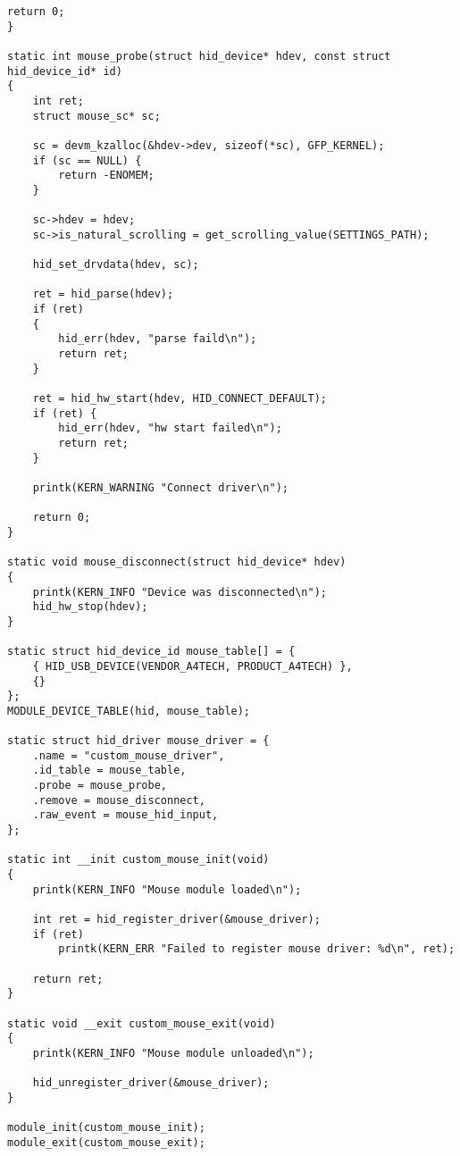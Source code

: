 \documentclass{bmstu}
\begin{document}
\begin{lstlisting}[caption={Загружаемый модуль ядра реализующий драйвер мыши}, label=lst:prill]
    return 0;
}

static int mouse_probe(struct hid_device* hdev, const struct hid_device_id* id)
{
    int ret;
    struct mouse_sc* sc;

    sc = devm_kzalloc(&hdev->dev, sizeof(*sc), GFP_KERNEL);
    if (sc == NULL) {
        return -ENOMEM;
    }

    sc->hdev = hdev;
    sc->is_natural_scrolling = get_scrolling_value(SETTINGS_PATH);

    hid_set_drvdata(hdev, sc);

    ret = hid_parse(hdev);
    if (ret)
    {
        hid_err(hdev, "parse faild\n");
        return ret;
    }

    ret = hid_hw_start(hdev, HID_CONNECT_DEFAULT);
    if (ret) {
        hid_err(hdev, "hw start failed\n");
        return ret;
    }

    printk(KERN_WARNING "Connect driver\n");

    return 0;
}

static void mouse_disconnect(struct hid_device* hdev)
{
    printk(KERN_INFO "Device was disconnected\n");
    hid_hw_stop(hdev);
}

static struct hid_device_id mouse_table[] = {
    { HID_USB_DEVICE(VENDOR_A4TECH, PRODUCT_A4TECH) },
    {}
};
MODULE_DEVICE_TABLE(hid, mouse_table);

static struct hid_driver mouse_driver = {
    .name = "custom_mouse_driver",
    .id_table = mouse_table,
    .probe = mouse_probe,
    .remove = mouse_disconnect,
    .raw_event = mouse_hid_input,
};

static int __init custom_mouse_init(void)
{
    printk(KERN_INFO "Mouse module loaded\n");

    int ret = hid_register_driver(&mouse_driver);
    if (ret)
        printk(KERN_ERR "Failed to register mouse driver: %d\n", ret);

    return ret;
}

static void __exit custom_mouse_exit(void)
{
    printk(KERN_INFO "Mouse module unloaded\n");

    hid_unregister_driver(&mouse_driver);
}

module_init(custom_mouse_init);
module_exit(custom_mouse_exit);
\end{lstlisting}



% 
% 

% 
% 
% 
% 
% 
% 

% 
\end{document}
